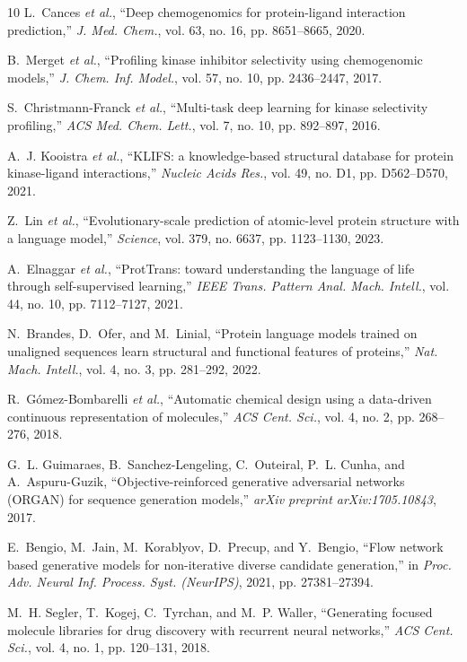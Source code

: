 \documentclass[journal]{IEEEtran}
\begin{document}
\begin{thebibliography}{10}
L.~Cances \emph{et al.}, ``Deep chemogenomics for protein-ligand interaction prediction,'' \emph{J. Med. Chem.}, vol. 63, no. 16, pp. 8651--8665, 2020.

B.~Merget \emph{et al.}, ``Profiling kinase inhibitor selectivity using chemogenomic models,'' \emph{J. Chem. Inf. Model.}, vol. 57, no. 10, pp. 2436--2447, 2017.

S.~Christmann-Franck \emph{et al.}, ``Multi-task deep learning for kinase selectivity profiling,'' \emph{ACS Med. Chem. Lett.}, vol. 7, no. 10, pp. 892--897, 2016.

A.~J. Kooistra \emph{et al.}, ``KLIFS: a knowledge-based structural database for protein kinase-ligand interactions,'' \emph{Nucleic Acids Res.}, vol. 49, no. D1, pp. D562--D570, 2021.

Z.~Lin \emph{et al.}, ``Evolutionary-scale prediction of atomic-level protein structure with a language model,'' \emph{Science}, vol. 379, no. 6637, pp. 1123--1130, 2023.

A.~Elnaggar \emph{et al.}, ``ProtTrans: toward understanding the language of life through self-supervised learning,'' \emph{IEEE Trans. Pattern Anal. Mach. Intell.}, vol. 44, no. 10, pp. 7112--7127, 2021.

N.~Brandes, D.~Ofer, and M.~Linial, ``Protein language models trained on unaligned sequences learn structural and functional features of proteins,'' \emph{Nat. Mach. Intell.}, vol. 4, no. 3, pp. 281--292, 2022.

R.~G{\'o}mez-Bombarelli \emph{et al.}, ``Automatic chemical design using a data-driven continuous representation of molecules,'' \emph{ACS Cent. Sci.}, vol. 4, no. 2, pp. 268--276, 2018.

G.~L. Guimaraes, B.~Sanchez-Lengeling, C.~Outeiral, P.~L. Cunha, and A.~Aspuru-Guzik, ``Objective-reinforced generative adversarial networks (ORGAN) for sequence generation models,'' \emph{arXiv preprint arXiv:1705.10843}, 2017.

E.~Bengio, M.~Jain, M.~Korablyov, D.~Precup, and Y.~Bengio, ``Flow network based generative models for non-iterative diverse candidate generation,'' in \emph{Proc. Adv. Neural Inf. Process. Syst. (NeurIPS)}, 2021, pp. 27381--27394.

M.~H. Segler, T.~Kogej, C.~Tyrchan, and M.~P. Waller, ``Generating focused molecule libraries for drug discovery with recurrent neural networks,'' \emph{ACS Cent. Sci.}, vol. 4, no. 1, pp. 120--131, 2018.


\end{thebibliography}
\end{document}
